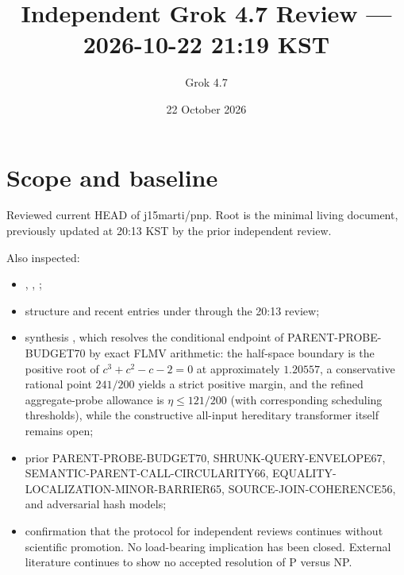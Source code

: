 \documentclass[11pt]{article}
\title{Independent Grok 4.7 Review --- 2026-10-22 21:19 KST}
\author{Grok 4.7}
\date{22 October 2026}
\begin{document}
\maketitle

\begin{center}
\end{center}

\section{Scope and baseline}
Reviewed current HEAD of j15marti/pnp. Root  is the minimal living document, previously updated at 20:13 KST by the prior independent review.

Also inspected:
\begin{itemize}
\item {}, , ;
\item structure and recent entries under  through the 20:13 review;
\item synthesis , which resolves the conditional endpoint of PARENT-PROBE-BUDGET70 by exact FLMV arithmetic: the half-space boundary is the positive root of $c^3 + c^2 - c - 2 = 0$ at approximately $1.20557$, a conservative rational point $241/200$ yields a strict positive margin, and the refined aggregate-probe allowance is $\eta\le 121/200$ (with corresponding scheduling thresholds), while the constructive all-input hereditary transformer itself remains open;
\item prior PARENT-PROBE-BUDGET70, SHRUNK-QUERY-ENVELOPE67, SEMANTIC-PARENT-CALL-CIRCULARITY66, EQUALITY-LOCALIZATION-MINOR-BARRIER65, SOURCE-JOIN-COHERENCE56, and adversarial hash models;
\item confirmation that the protocol for independent reviews continues without scientific promotion. No load-bearing implication has been closed. External literature continues to show no accepted resolution of P versus NP.
\end{itemize}
\end{document}
